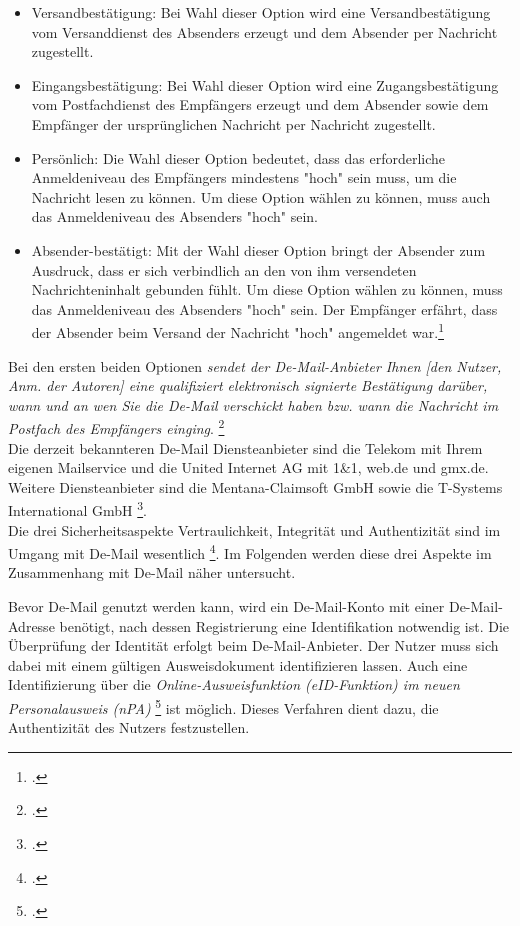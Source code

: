\documentclass  [paper=a4,
				fontsize=12pt,
				listof=totoc,
				bibliography=totoc
				]{scrreprt}
\begin{document}
{			\begin{itemize}
				\item Versandbestätigung: Bei Wahl dieser Option wird eine Versandbestätigung vom Versanddienst des Absenders erzeugt und dem Absender per Nachricht zugestellt.
				\item Eingangsbestätigung: Bei Wahl dieser Option wird eine Zugangsbestätigung vom Postfachdienst des Empfängers erzeugt und dem Absender sowie dem Empfänger der ursprünglichen Nachricht per Nachricht zugestellt.
				\item Persönlich: Die Wahl dieser Option bedeutet, dass das erforderliche Anmeldeniveau des Empfängers mindestens "hoch" sein muss, um die Nachricht lesen zu können. Um diese Option wählen zu können, muss auch das Anmeldeniveau des Absenders "hoch" sein.
				\item Absender-bestätigt: Mit der Wahl dieser Option bringt der Absender zum Ausdruck, dass er sich verbindlich an den von ihm versendeten Nachrichteninhalt gebunden fühlt. Um diese Option wählen zu können, muss das Anmeldeniveau des Absenders "hoch" sein. Der Empfänger erfährt, dass der Absender beim Versand der Nachricht "hoch" angemeldet war.\footcite[Vgl.][]{BSIMerkmale}
			\end{itemize}
			Bei den ersten beiden Optionen \textit{\glqq sendet der De-Mail-Anbieter Ihnen [den Nutzer, Anm. der Autoren] eine qualifiziert elektronisch signierte Bestätigung darüber, wann und an wen Sie die De-Mail verschickt haben bzw. wann die Nachricht im Postfach des Empfängers einging\grqq}. \footcite[Vgl.][S. 15]{BSIDeMail}\medskip\\
			
			Die derzeit bekannteren De-Mail Diensteanbieter sind die Telekom mit Ihrem eigenen Mailservice und die United Internet AG mit 1\&1, web.de und gmx.de.
			Weitere Diensteanbieter sind die Mentana-Claimsoft GmbH sowie die T-Systems International GmbH \footcite[Vgl.][]{BSIDiensteanbieter}.\medskip\\
			
			Die drei Sicherheitsaspekte Vertraulichkeit, Integrität und Authentizität sind im Umgang mit De-Mail wesentlich \footcite[Vgl.][]{BSIGrundlagen}.
			Im Folgenden werden diese drei Aspekte im Zusammenhang mit De-Mail näher untersucht.
			
			Bevor De-Mail genutzt werden kann, wird ein De-Mail-Konto mit einer De-Mail-Adresse benötigt, nach dessen Registrierung eine Identifikation notwendig ist.
			Die Überprüfung der Identität erfolgt beim De-Mail-Anbieter.
			Der Nutzer muss sich dabei mit einem gültigen Ausweisdokument identifizieren lassen.
			Auch eine Identifizierung über die \textit{\glqq Online-Ausweisfunktion (eID-Funktion) im neuen Personalausweis (nPA)\grqq} \footcite[Vgl.][S. 13]{BSIDeMail} ist möglich.
			Dieses Verfahren dient dazu, die Authentizität des Nutzers festzustellen.\medskip\\
			
}
\end{document}
